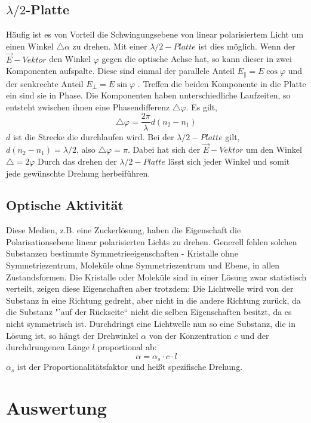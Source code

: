 \subsection{$ \lambda/2 $-Platte}
Häufig ist es von Vorteil die Schwingungsebene von linear polarisiertem Licht um einen Winkel $ \bigtriangleup\alpha $ zu drehen. Mit einer $ \lambda/2-Platte $ ist dies möglich. Wenn der $ \vec{E}-Vektor $ den Winkel $ \varphi $ gegen die optische Achse hat, so kann dieser in zwei Komponenten aufspalte. Diese sind einmal der parallele Anteil $ E_{\|} = E\cos \varphi $ und der senkrechte Anteil $ E_{\bot}=E\sin \varphi $ . Treffen die beiden Komponente in die Platte ein sind sie in Phase. Die Komponenten haben unterschiedliche Laufzeiten, so entsteht zwischen ihnen eine Phasendifferenz $\bigtriangleup\varphi $. Es gilt, 
\begin{equation}
\bigtriangleup\varphi=\frac{2\pi}{\lambda}d(n_{2}-n_{1})
\end{equation}
$d$ ist die Strecke die durchlaufen wird. Bei der $ \lambda/2 - Platte $ gilt, $ d(n_{2}-n_{1})=\lambda/2 $, also $ \bigtriangleup\varphi=\pi $. Dabei hat sich der $ \vec{E}-Vektor $ um den Winkel $\bigtriangleup=2\varphi $ Durch das drehen der $ \lambda/2-Platte $ lässt sich jeder Winkel und somit jede gewünschte Drehung herbeiführen.
\subsection{Optische Aktivität}
Diese Medien, z.B. eine Zuckerlösung, haben die Eigenschaft die Polarisationsebene linear polarisierten Lichts zu drehen. Generell fehlen solchen Substanzen bestimmte Symmetrieeigenschaften - Kristalle ohne Symmetriezentrum, Moleküle ohne Symmetriezentrum und Ebene, in allen Zustandsformen. Die Kristalle oder Moleküle sind in einer Lösung zwar statistisch verteilt, zeigen diese Eigenschaften aber trotzdem: Die Lichtwelle wird von der Substanz in eine Richtung gedreht, aber nicht in die andere Richtung zurück, da die Substanz "'auf der Rückseite`` nicht die selben Eigenschaften besitzt, da es nicht symmetrisch ist. Durchdringt eine Lichtwelle nun so eine Substanz, die in Lösung ist, so hängt der Drehwinkel $\alpha$ von der Konzentration $c$ und der durchdrungenen Länge $l$ proportional ab:
\begin{equation}
\alpha = \alpha_{s}\cdot c\cdot l \label{eq:opt_akt}
\end{equation}
$\alpha_{s}$ ist der Proportionalitätsfaktor und heißt spezifische Drehung.
\newpage
\section{Auswertung}
